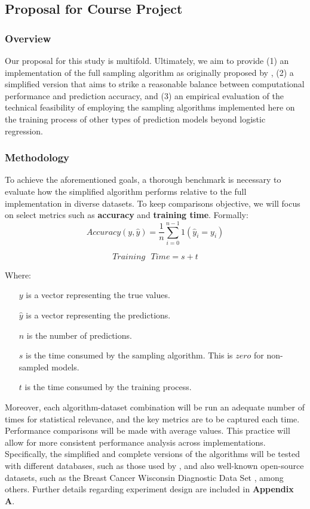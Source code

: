 \documentclass{article}
\theoremstyle{plain}
\theoremstyle{definition}
\theoremstyle{remark}
\begin{document}
\subsection{Proposal for Course Project}

\subsubsection{Overview}

Our proposal for this study is multifold. Ultimately, we aim to provide (1) an implementation of the full sampling algorithm as originally proposed by \citeauthor{chow24}, (2) a simplified version that aims to strike a reasonable balance between computational performance and prediction accuracy, and (3) an empirical evaluation of the technical feasibility of employing the sampling algorithms implemented here on the training process of other types of prediction models beyond logistic regression.

\subsubsection{Methodology}

To achieve the aforementioned goals, a thorough benchmark is necessary to evaluate how the simplified algorithm performs relative to the full implementation in diverse datasets. To keep comparisons objective, we will focus on select metrics such as \textbf{accuracy} and \textbf{training time}. Formally:
$$
Accuracy(y, \hat{y}) = \frac{1}{n} \sum_{i=0}^{n-1} 1(\hat{y}_i = y_i)
$$

$$
Training\text{ }Time = s + t
$$

Where:

\begin{itemize}

\item[$y$] is a vector representing the true values.
\item[$\hat{y}$] is a vector representing the predictions.
\item[$n$] is the number of predictions.
\item[$s$] is the time consumed by the sampling algorithm. This is $zero$ for non-sampled models.
\item[$t$] is the time consumed by the training process.


\end{itemize}

Moreover, each algorithm-dataset combination will be run an adequate number of times for statistical relevance, and the key metrics are to be captured each time. Performance comparisons will be made with average values. This practice will allow for more consistent performance analysis across implementations. Specifically, the simplified and complete versions of the algorithms will be tested with different databases, such as those used by \citeauthor{chow24}, and also well-known open-source datasets, such as the Breast Cancer Wisconsin Diagnostic Data Set \cite{breastcancer}, among others. Further details regarding experiment design are included in \textbf{Appendix A}.
\end{document}
